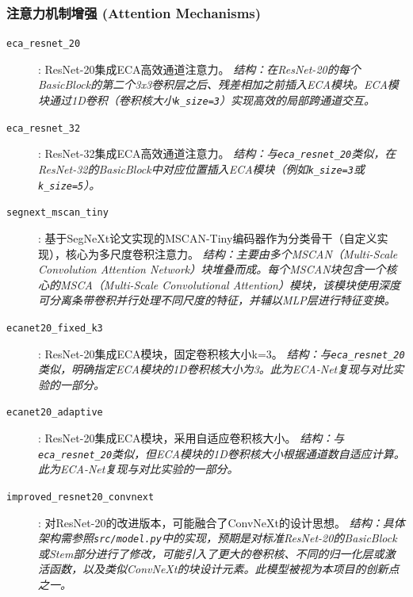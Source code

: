 \documentclass[a4paper]{article}
\begin{document}
\subsubsection{注意力机制增强 (Attention Mechanisms)}
\begin{description}
    \item[\texttt{eca\_resnet\_20}]: ResNet-20集成ECA高效通道注意力。 \textit{结构：在ResNet-20的每个BasicBlock的第二个3x3卷积层之后、残差相加之前插入ECA模块。ECA模块通过1D卷积（卷积核大小\texttt{k\_size=3}）实现高效的局部跨通道交互。}
    \item[\texttt{eca\_resnet\_32}]: ResNet-32集成ECA高效通道注意力。 \textit{结构：与\texttt{eca\_resnet\_20}类似，在ResNet-32的BasicBlock中对应位置插入ECA模块（例如\texttt{k\_size=3}或\texttt{k\_size=5}）。}
    \item[\texttt{segnext\_mscan\_tiny}]: 基于SegNeXt论文实现的MSCAN-Tiny编码器作为分类骨干（自定义实现），核心为多尺度卷积注意力。 \textit{结构：主要由多个MSCAN（Multi-Scale Convolution Attention Network）块堆叠而成。每个MSCAN块包含一个核心的MSCA（Multi-Scale Convolutional Attention）模块，该模块使用深度可分离条带卷积并行处理不同尺度的特征，并辅以MLP层进行特征变换。}
    \item[\texttt{ecanet20\_fixed\_k3}]: ResNet-20集成ECA模块，固定卷积核大小k=3。 \textit{结构：与\texttt{eca\_resnet\_20}类似，明确指定ECA模块的1D卷积核大小为3。此为ECA-Net复现与对比实验的一部分。}
    \item[\texttt{ecanet20\_adaptive}]: ResNet-20集成ECA模块，采用自适应卷积核大小。 \textit{结构：与\texttt{eca\_resnet\_20}类似，但ECA模块的1D卷积核大小根据通道数自适应计算。此为ECA-Net复现与对比实验的一部分。}
    \item[\texttt{improved\_resnet20\_convnext}]: 对ResNet-20的改进版本，可能融合了ConvNeXt的设计思想。 \textit{结构：具体架构需参照\texttt{src/model.py}中的实现，预期是对标准ResNet-20的BasicBlock或Stem部分进行了修改，可能引入了更大的卷积核、不同的归一化层或激活函数，以及类似ConvNeXt的块设计元素。此模型被视为本项目的创新点之一。}
\end{description}
\end{document}
